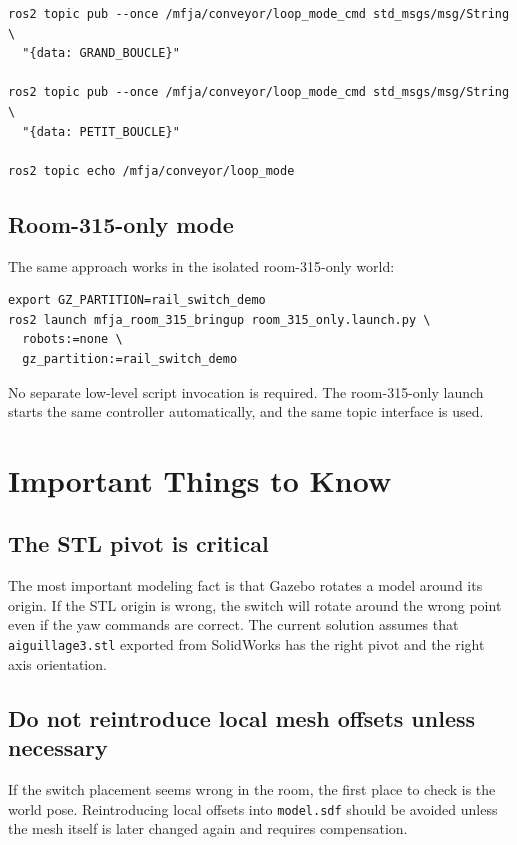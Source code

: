 \documentclass[11pt,a4paper]{article}
\begin{document}
\begin{lstlisting}[style=reportcode,caption={Example commands for synchronized conveyor loop-mode switching.}]
ros2 topic pub --once /mfja/conveyor/loop_mode_cmd std_msgs/msg/String \
  "{data: GRAND_BOUCLE}"

ros2 topic pub --once /mfja/conveyor/loop_mode_cmd std_msgs/msg/String \
  "{data: PETIT_BOUCLE}"

ros2 topic echo /mfja/conveyor/loop_mode
\end{lstlisting}

\subsection{Room-315-only mode}
The same approach works in the isolated room-315-only world:

\begin{lstlisting}[style=reportcode,caption={Example command for the room-315-only switch test.}]
export GZ_PARTITION=rail_switch_demo
ros2 launch mfja_room_315_bringup room_315_only.launch.py \
  robots:=none \
  gz_partition:=rail_switch_demo
\end{lstlisting}

No separate low-level script invocation is required. The room-315-only launch starts the same controller automatically, and the same  topic interface is used.

\section{Important Things to Know}
\subsection{The STL pivot is critical}
The most important modeling fact is that Gazebo rotates a model around its origin. If the STL origin is wrong, the switch will rotate around the wrong point even if the yaw commands are correct. The current solution assumes that \texttt{aiguillage3.stl} exported from SolidWorks has the right pivot and the right axis orientation.

\subsection{Do not reintroduce local mesh offsets unless necessary}
If the switch placement seems wrong in the room, the first place to check is the world pose. Reintroducing local offsets into \texttt{model.sdf} should be avoided unless the mesh itself is later changed again and requires compensation.
\end{document}
